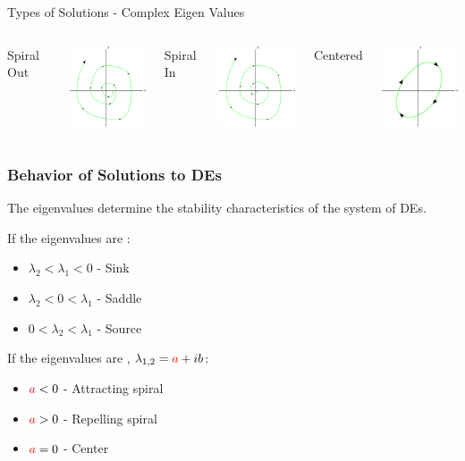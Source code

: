 \begin{frame}{Types of Solutions - Complex Eigen Values}

  \begin{columns}

    Spiral Out

    \includegraphics[width=3cm]{img/phasePlaneSpiralOut}

    Spiral In

    \includegraphics[width=3cm]{img/phasePlaneSpiralin}

    Centered

    \includegraphics[width=3cm]{img/phasePlaneCentered}

  \end{columns}
  
\end{frame}



\begin{frame}
  \frametitle{Behavior of Solutions to DEs}

  The eigenvalues determine the stability characteristics of the
  system of DEs.

  If the eigenvalues are :
  \begin{itemize}
  \item $\lambda_2 < \lambda_1 < 0$ - Sink
  \item $\lambda_2 < 0 < \lambda_1$ - Saddle
  \item $0 < \lambda_2 < \lambda_1$ - Source
  \end{itemize}

  If the eigenvalues are , $\lambda_{1,2}={\color{red}a}+ib$:
  \begin{itemize}
  \item ${\color{red}a}<0$ - Attracting spiral
  \item ${\color{red}a}>0$ - Repelling spiral
  \item ${\color{red}a}=0$ - Center
  \end{itemize}

\end{frame}

